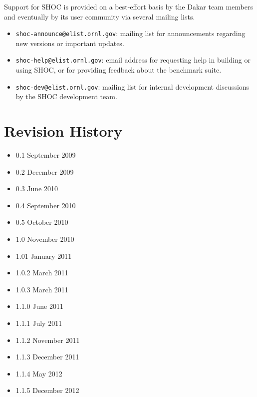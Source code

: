 \documentclass[11pt]{article}
\begin{document}
Support for SHOC is provided on a best-effort basis by the Dakar team members
and eventually by its user community via several mailing lists.
\begin{itemize}
\item \verb+shoc-announce@elist.ornl.gov+: mailing list for announcements
regarding new versions or important updates.
\item \verb+shoc-help@elist.ornl.gov+: email address for requesting
help in building or using SHOC, or for providing feedback about the benchmark 
suite.
\item \verb+shoc-dev@elist.ornl.gov+: mailing list for internal 
development discussions by the SHOC development team.
\end{itemize}


\section*{Revision History}
\begin{itemize}
\item 0.1 September 2009
\item 0.2 December 2009
\item 0.3 June 2010
\item 0.4 September 2010
\item 0.5 October 2010
\item 1.0 November 2010
\item 1.01 January 2011
\item 1.0.2 March 2011
\item 1.0.3 March 2011
\item 1.1.0 June 2011
\item 1.1.1 July 2011
\item 1.1.2 November 2011
\item 1.1.3 December 2011
\item 1.1.4 May 2012
\item 1.1.5 December 2012
\end{itemize}



\end{document}
